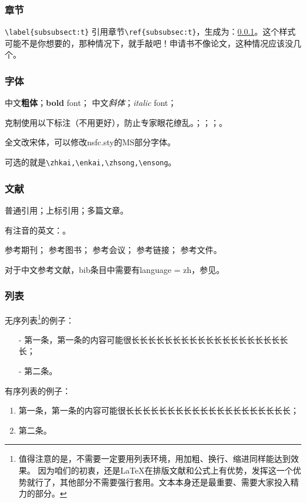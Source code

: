 \subsubsection{章节}\label{subsubsec:t}
\verb|\label{subsubsect:t}|
引用章节\verb|\ref{subsubsec:t}|，生成为：\ref{subsubsec:t}。这个样式可能不是你想要的，那种情况下，就手敲吧！申请书不像论文，这种情况应该没几个。

\subsubsection{字体}
中文\textbf{粗体}；\textbf{bold} font；
中文\textit{斜体}；\textit{italic} font；

克制使用以下标注（不用更好），防止专家眼花缭乱。；；；。

全文改宋体，可以修改nsfc.sty的MS部分字体。

可选的就是\verb|\zhkai,\enkai,\zhsong,\ensong|。

\subsubsection{文献}
普通引用\cite{test}；上标引用；多篇文章。

有注音的英文：\cite{test}。

参考期刊\cite{test}；
参考图书\cite{test2}；
参考会议\cite{test5}；
参考链接\cite{test4}；
参考文件\cite{test6}。

对于中文参考文献，bib条目中需要有language = {zh}，参见\cite{test2}。
\subsubsection{列表}
无序列表\footnote{值得注意的是，不需要一定要用列表环境，用加粗、换行、缩进同样能达到效果。
	因为咱们的初衷，还是LaTeX在排版文献和公式上有优势，发挥这一个优势就行了，其他部分不需要强行套用。文本本身还是最重要、需要大家投入精力的部分。}的例子：
\begin{itemize}[left= 50pt]
	\item[-] 第一条，第一条的内容可能很长长长长长长长长长长长长长长长长长长长长；
	\item[-] 第二条。
\end{itemize}

有序列表的例子：
\begin{enumerate}[left= 50pt]
	\item 第一条，第一条的内容可能很长长长长长长长长长长长长长长长长长长长长；
	\item 第二条。
\end{enumerate}

